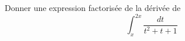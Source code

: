 Donner une expression factoris\'ee de la d{\'e}riv{\'e}e de \[\int_x^{2x} \frac{dt}{t^2+t+1}\] \bigskip \bigskip \bigskip